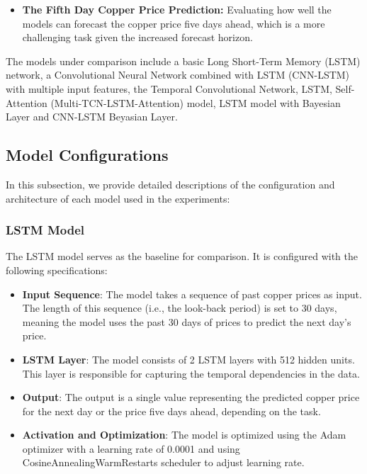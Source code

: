 \documentclass[final-report]{report-template}
\begin{document}
\begin{itemize}
    \item \textbf{The Fifth Day Copper Price Prediction:} Evaluating how well the models can forecast the copper price five days ahead, which is a more challenging task given the increased forecast horizon.
\end{itemize}

The models under comparison include a basic Long Short-Term Memory (LSTM) network, a Convolutional Neural Network combined with LSTM (CNN-LSTM) with multiple input features, the Temporal Convolutional Network, LSTM, Self-Attention (Multi-TCN-LSTM-Attention) model, LSTM model with Bayesian Layer and CNN-LSTM Beyasian Layer.

\subsection{Model Configurations}
In this subsection, we provide detailed descriptions of the configuration and architecture of each model used in the experiments:

\subsubsection{\textbf{LSTM Model}}
The LSTM model serves as the baseline for comparison. It is configured with the following specifications:
\begin{itemize}
    \item \textbf{Input Sequence}: The model takes a sequence of past copper prices as input. The length of this sequence (i.e., the look-back period) is set to 30 days, meaning the model uses the past 30 days of prices to predict the next day’s price.
    \item \textbf{LSTM Layer}: The model consists of 2 LSTM layers with 512 hidden units. This layer is responsible for capturing the temporal dependencies in the data.
    \item \textbf{Output}: The output is a single value representing the predicted copper price for the next day or the price five days ahead, depending on the task.
    \item \textbf{Activation and Optimization}: The model is optimized using the Adam optimizer with a learning rate of 0.0001 and using CosineAnnealingWarmRestarts scheduler to adjust learning rate.
\end{itemize}
\end{document}
